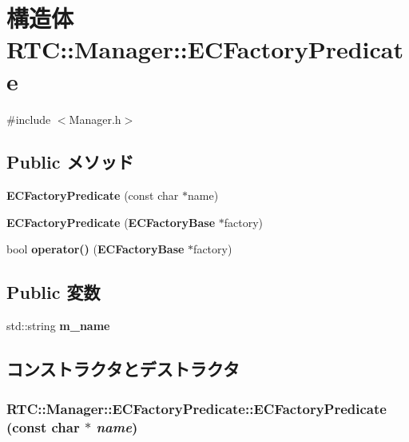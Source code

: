 \section{構造体 RTC::Manager::ECFactoryPredicate}
\label{structRTC_1_1Manager_1_1ECFactoryPredicate}


{\ttfamily \#include $<$Manager.h$>$}

\subsection*{Public メソッド}
\begin{DoxyCompactItemize}
\item 
{\bf ECFactoryPredicate} (const char $\ast$name)
\item 
{\bf ECFactoryPredicate} ({\bf ECFactoryBase} $\ast$factory)
\item 
bool {\bf operator()} ({\bf ECFactoryBase} $\ast$factory)
\end{DoxyCompactItemize}
\subsection*{Public 変数}
\begin{DoxyCompactItemize}
\item 
std::string {\bf m\_\-name}
\end{DoxyCompactItemize}


\subsection{コンストラクタとデストラクタ}
\subsubsection[{ECFactoryPredicate}]{\setlength{\rightskip}{0pt plus 5cm}RTC::Manager::ECFactoryPredicate::ECFactoryPredicate (const char $\ast$ {\em name})\hspace{0.3cm}{\ttfamily  [inline]}}\label{structRTC_1_1Manager_1_1ECFactoryPredicate_acb95e8e1a216995c855c71cf7434e1b5}

